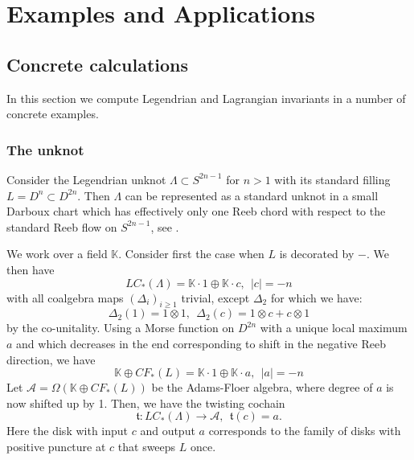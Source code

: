 \documentclass{gtpart}
\renewcommand{\t}{\mathfrak{t}}
\newcommand{\A}{\mathscr{A}}
\begin{document}
\section{Examples and Applications}
\label{ssec:applications} 
\subsection{Concrete calculations}
In this section we compute Legendrian and Lagrangian invariants in a number of concrete examples.

\subsubsection{The unknot}
Consider the Legendrian unknot $\Lambda \subset S^{2n-1}$ for $n>1$ with its
standard filling $L=D^{n} \subset D^{2n}$. Then $\Lambda$ can be represented as a standard unknot in a small Darboux chart which has effectively only one Reeb chord with respect to the standard Reeb flow on $S^{2n-1}$, see \cite[Section 7.1]{BEE}. 

We work over a field $\mathbb{K}$. Consider first the case when $L$ is decorated by $-$. We then have
\[ 
LC_*(\Lambda) = \mathbb{K}\cdot 1 \oplus \mathbb{K} \cdot c, \ \ |c|=-n 
\]
with all coalgebra maps $(\Delta_i)_{i\geq 1}$ trivial, except $\Delta_2$ for which we have:
\[ 
\Delta_2(1) = 1 \otimes 1, \ \ \Delta_2(c) = 1 \otimes c + c \otimes 1 
\]
by the co-unitality. 
Using a Morse function on $D^{2n}$ with a unique local maximum $a$ and which decreases in the end corresponding to shift in the negative Reeb direction, we have 
\[ 
\mathbb{K} \oplus CF_*(L) = \mathbb{K} \cdot 1  \oplus \mathbb{K} \cdot a, \ \ |a|=-n 
\]
Let $\A = \Omega( \mathbb{K} \oplus CF_*(L))$ be the Adams-Floer algebra, where degree of $a$ is now shifted up by 1. Then, we have the twisting cochain 
\[ 
\t \colon LC_{\ast}(\Lambda) \to \A, \ \ \t(c) =a. 
\]
Here the disk with input $c$ and output $a$ corresponds to the family of disks with positive puncture at $c$ that sweeps $L$ once. 
\end{document}
